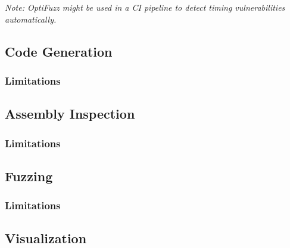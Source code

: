\textit{Note: OptiFuzz might be used in a CI pipeline to detect timing vulnerabilities automatically.}
\subsection{Code Generation}
\subsubsection{Limitations}
\subsection{Assembly Inspection}
\subsubsection{Limitations}
\subsection{Fuzzing}
\subsubsection{Limitations}
\subsection{Visualization}